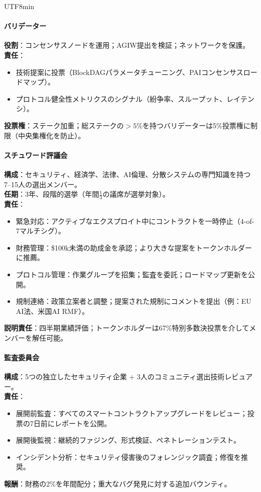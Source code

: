 \documentclass[11pt]{article}
\begin{document}
\begin{CJK}{UTF8}{min}
\begin{itemize}[noitemsep]
\paragraph{バリデーター}
\textbf{役割}：コンセンサスノードを運用；AGIW提出を検証；ネットワークを保護。\\
\textbf{責任}：
\begin{itemize}[noitemsep]
  \item 技術提案に投票（BlockDAGパラメータチューニング、PAIコンセンサスロードマップ）。
  \item プロトコル健全性メトリクスのシグナル（紛争率、スループット、レイテンシ）。
\end{itemize}
\textbf{投票権}：ステーク加重；総ステークの$>5\%$を持つバリデーターは5\%投票権に制限（中央集権化を防止）。

\paragraph{スチュワード評議会}
\textbf{構成}：セキュリティ、経済学、法律、AI倫理、分散システムの専門知識を持つ7--15人の選出メンバー。\\
\textbf{任期}：3年、段階的選挙（年間$\frac{1}{3}$の議席が選挙対象）。\\
\textbf{責任}：
\begin{itemize}[noitemsep]
  \item 緊急対応：アクティブなエクスプロイト中にコントラクトを一時停止（4-of-7マルチシグ）。
  \item 財務管理：\$100k未満の助成金を承認；より大きな提案をトークンホルダーに推薦。
  \item プロトコル管理：作業グループを招集；監査を委託；ロードマップ更新を公開。
  \item 規制連絡：政策立案者と調整；提案された規制にコメントを提出（例：EU AI法、米国AI RMF）。
\end{itemize}
\textbf{説明責任}：四半期業績評価；トークンホルダーは67\%特別多数決投票を介してメンバーを解任可能。

\paragraph{監査委員会}
\textbf{構成}：5つの独立したセキュリティ企業 + 3人のコミュニティ選出技術レビュアー。\\
\textbf{責任}：
\begin{itemize}[noitemsep]
  \item 展開前監査：すべてのスマートコントラクトアップグレードをレビュー；投票の7日前にレポートを公開。
  \item 展開後監視：継続的ファジング、形式検証、ペネトレーションテスト。
  \item インシデント分析：セキュリティ侵害後のフォレンジック調査；修復を推奨。
\end{itemize}
\textbf{報酬}：財務の2\%を年間配分；重大なバグ発見に対する追加バウンティ。


\end{itemize}
\end{CJK}
\end{document}
